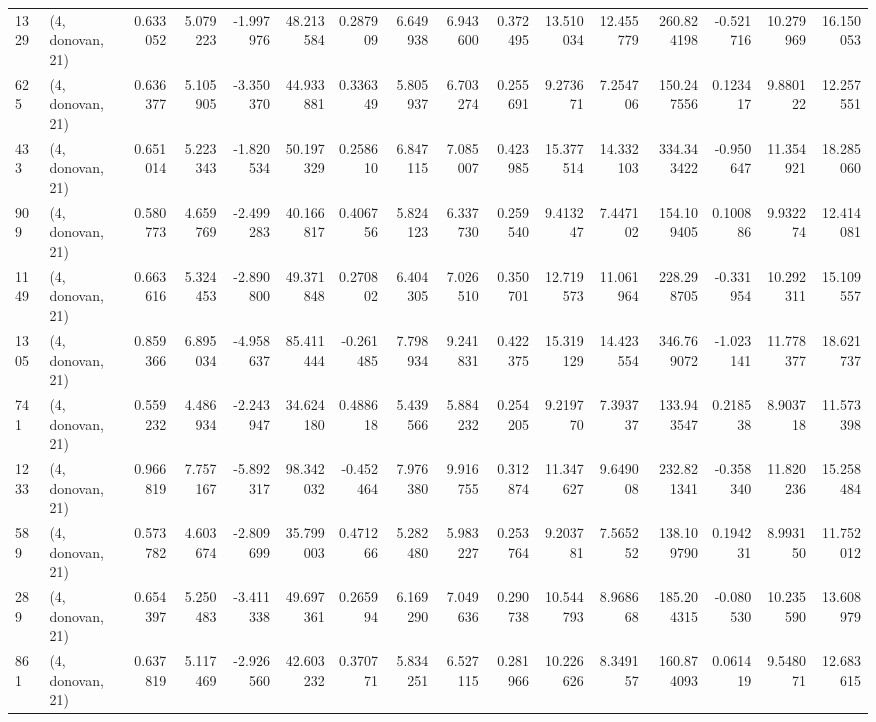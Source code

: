 \begin{tabular}{llrrrrrrrrrrrrrr}
1329 &  (4, donovan, 21) &   0.633052 &   5.079223 &  -1.997976 &     48.213584 &    0.287909 &    6.649938 &    6.943600 &  0.372495 &  13.510034 &  12.455779 &   260.824198 &  -0.521716 &  10.279969 &  16.150053 \\
625  &  (4, donovan, 21) &   0.636377 &   5.105905 &  -3.350370 &     44.933881 &    0.336349 &    5.805937 &    6.703274 &  0.255691 &   9.273671 &   7.254706 &   150.247556 &   0.123417 &   9.880122 &  12.257551 \\
433  &  (4, donovan, 21) &   0.651014 &   5.223343 &  -1.820534 &     50.197329 &    0.258610 &    6.847115 &    7.085007 &  0.423985 &  15.377514 &  14.332103 &   334.343422 &  -0.950647 &  11.354921 &  18.285060 \\
909  &  (4, donovan, 21) &   0.580773 &   4.659769 &  -2.499283 &     40.166817 &    0.406756 &    5.824123 &    6.337730 &  0.259540 &   9.413247 &   7.447102 &   154.109405 &   0.100886 &   9.932274 &  12.414081 \\
1149 &  (4, donovan, 21) &   0.663616 &   5.324453 &  -2.890800 &     49.371848 &    0.270802 &    6.404305 &    7.026510 &  0.350701 &  12.719573 &  11.061964 &   228.298705 &  -0.331954 &  10.292311 &  15.109557 \\
1305 &  (4, donovan, 21) &   0.859366 &   6.895034 &  -4.958637 &     85.411444 &   -0.261485 &    7.798934 &    9.241831 &  0.422375 &  15.319129 &  14.423554 &   346.769072 &  -1.023141 &  11.778377 &  18.621737 \\
741  &  (4, donovan, 21) &   0.559232 &   4.486934 &  -2.243947 &     34.624180 &    0.488618 &    5.439566 &    5.884232 &  0.254205 &   9.219770 &   7.393737 &   133.943547 &   0.218538 &   8.903718 &  11.573398 \\
1233 &  (4, donovan, 21) &   0.966819 &   7.757167 &  -5.892317 &     98.342032 &   -0.452464 &    7.976380 &    9.916755 &  0.312874 &  11.347627 &   9.649008 &   232.821341 &  -0.358340 &  11.820236 &  15.258484 \\
589  &  (4, donovan, 21) &   0.573782 &   4.603674 &  -2.809699 &     35.799003 &    0.471266 &    5.282480 &    5.983227 &  0.253764 &   9.203781 &   7.565252 &   138.109790 &   0.194231 &   8.993150 &  11.752012 \\
289  &  (4, donovan, 21) &   0.654397 &   5.250483 &  -3.411338 &     49.697361 &    0.265994 &    6.169290 &    7.049636 &  0.290738 &  10.544793 &   8.968668 &   185.204315 &  -0.080530 &  10.235590 &  13.608979 \\
861  &  (4, donovan, 21) &   0.637819 &   5.117469 &  -2.926560 &     42.603232 &    0.370771 &    5.834251 &    6.527115 &  0.281966 &  10.226626 &   8.349157 &   160.874093 &   0.061419 &   9.548071 &  12.683615 \\

\end{tabular}
